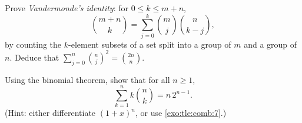 \begin{exercise}[$\star\star\star$]\label{exo:tle:comb:9}
Prove \emph{Vandermonde's identity}: for $0 \leq k \leq m + n$,
\[
\binom{m+n}{k} = \sum_{j=0}^{k} \binom{m}{j}\binom{n}{k-j},
\]
by counting the $k$-element subsets of a set split into a group of $m$ and a
group of $n$. Deduce that
$\displaystyle\sum_{j=0}^{n}\binom{n}{j}^{\!2} = \binom{2n}{n}$.
\end{exercise}

\begin{exercise}[$\star\star\star$]\label{exo:tle:comb:10}
Using the binomial theorem, show that for all $n \geq 1$,
\[
\sum_{k=1}^{n} k \binom{n}{k} = n\,2^{n-1}.
\]
(Hint: either differentiate $(1+x)^n$, or use \cref{exo:tle:comb:7}.)
\end{exercise}
